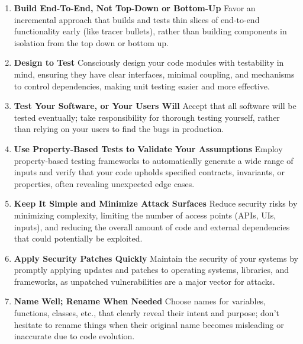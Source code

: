 \documentclass[11pt]{article}
\begin{document}
\begin{tcolorbox}[pragchapterbox={Chapter 7: While You Are Coding}]
\begin{multicols}{2}
\begin{enumerate}[label=\arabic*., start=61, itemsep=1ex, topsep=0pt, partopsep=0pt, labelwidth=!, labelindent=0pt, leftmargin=*]
    \item \textbf{Build End-To-End, Not Top-Down or Bottom-Up}
    Favor an incremental approach that builds and tests thin slices of end-to-end functionality early (like tracer bullets), rather than building components in isolation from the top down or bottom up.

    \item \textbf{Design to Test}
    Consciously design your code modules with testability in mind, ensuring they have clear interfaces, minimal coupling, and mechanisms to control dependencies, making unit testing easier and more effective.

    \item \textbf{Test Your Software, or Your Users Will}
    Accept that all software will be tested eventually; take responsibility for thorough testing yourself, rather than relying on your users to find the bugs in production.

    \item \textbf{Use Property-Based Tests to Validate Your Assumptions}
    Employ property-based testing frameworks to automatically generate a wide range of inputs and verify that your code upholds specified contracts, invariants, or properties, often revealing unexpected edge cases.

    \item \textbf{Keep It Simple and Minimize Attack Surfaces}
    Reduce security risks by minimizing complexity, limiting the number of access points (APIs, UIs, inputs), and reducing the overall amount of code and external dependencies that could potentially be exploited.

    \item \textbf{Apply Security Patches Quickly}
    Maintain the security of your systems by promptly applying updates and patches to operating systems, libraries, and frameworks, as unpatched vulnerabilities are a major vector for attacks.

    \item \textbf{Name Well; Rename When Needed}
    Choose names for variables, functions, classes, etc., that clearly reveal their intent and purpose; don't hesitate to rename things when their original name becomes misleading or inaccurate due to code evolution.
\end{enumerate}
\end{multicols}
\end{tcolorbox}
\end{document}
